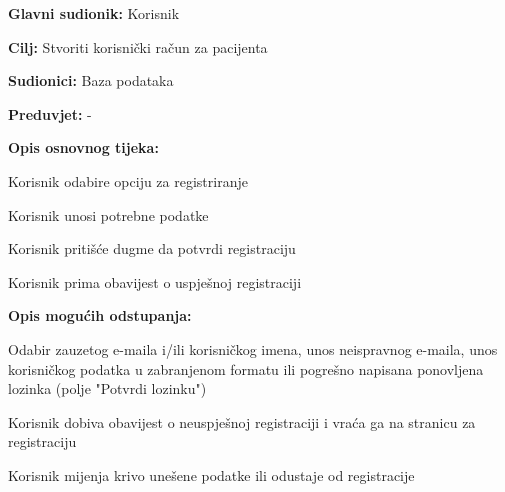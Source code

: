 					\noindent {}
					\begin{packed_item}
	
						\item \textbf{Glavni sudionik: }Korisnik
						\item  \textbf{Cilj:} Stvoriti korisnički račun za pacijenta
						\item  \textbf{Sudionici:} Baza podataka
						\item  \textbf{Preduvjet:} -
						\item  \textbf{Opis osnovnog tijeka:}
						
						\item[] \begin{packed_enum}
	
							\item Korisnik odabire opciju za registriranje
							\item Korisnik unosi potrebne podatke
							\item Korisnik pritišće dugme da potvrdi registraciju
							\item Korisnik prima obavijest o uspješnoj registraciji
						\end{packed_enum}
						
						\item  \textbf{Opis mogućih odstupanja:}
						
						\item[] \begin{packed_item}
	
							\item[2.a] Odabir zauzetog e-maila i/ili korisničkog imena, unos neispravnog e-maila, unos korisničkog podatka u zabranjenom formatu ili pogrešno napisana ponovljena lozinka (polje "Potvrdi lozinku")
							\item[] \begin{packed_enum}
								
								\item Korisnik dobiva obavijest o neuspješnoj registraciji i vraća ga na stranicu za registraciju
								\item Korisnik mijenja krivo unešene podatke ili odustaje od registracije
								
							\end{packed_enum}
							
						\end{packed_item}
					\end{packed_item}
					
